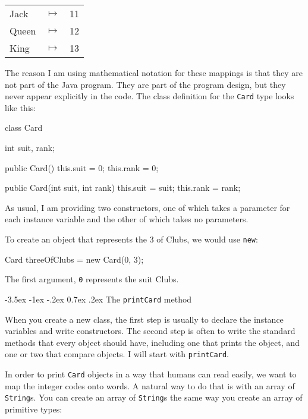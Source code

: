\documentclass{book}
\makeatletter
\renewcommand{\section}{\@startsection 
    {section} {1} {0mm}%
    {-3.5ex \@plus -1ex \@minus -.2ex}%
    {0.7ex \@plus.2ex}%
    {\normalfont\Large\bfseries}}
\makeatother
\begin{document}
\begin{tabular}{l c l}
Jack & $\mapsto$ & 11 \\
Queen & $\mapsto$ & 12 \\
King & $\mapsto$ & 13 \\
\end{tabular}

The reason I am using mathematical notation for these mappings is
that they are not part of the Java program.  They are part of the
program design, but they never appear explicitly in the code.
The class definition for the {\tt Card} type looks like this:

\begin{verbatimtab}
class Card
{
    int suit, rank;

    public Card() { 
        this.suit = 0;  this.rank = 0;
    }

    public Card(int suit, int rank) { 
        this.suit = suit;  this.rank = rank;
    }
}
\end{verbatimtab}

As usual, I am providing two constructors, one of which takes
a parameter for each instance variable and the other of which
takes no parameters.


To create an object that represents the 3 of Clubs, we would
use {\tt new}:

\begin{verbatimtab}
    Card threeOfClubs = new Card(0, 3);
\end{verbatimtab}
%
The first argument, {\tt 0} represents the suit Clubs.

\section{The {\tt printCard} method}
\label{printcard}

When you create a new class, the first step is usually to declare the
instance variables and write constructors.  The second step is often
to write the standard methods that every object should have, including
one that prints the object, and one or two that compare objects.  I
will start with {\tt printCard}.


In order to print {\tt Card} objects in a way that humans
can read easily, we want to map the integer codes onto words.
A natural way to do that is with an array of {\tt String}s.  You
can create an array of {\tt String}s the same way you create an
array of primitive types:
\end{document}

